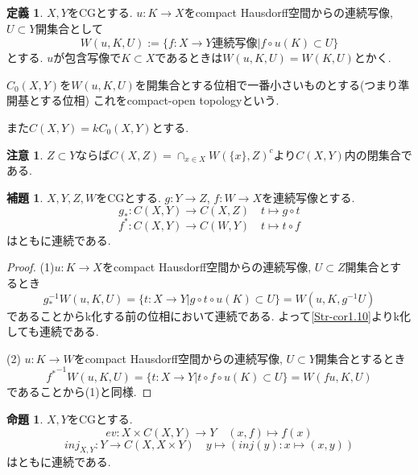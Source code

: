 \documentclass[dvipdfmx,a4paper,11pt]{article}
\theoremstyle{definition}
\newtheorem{lem}[thm]{補題}
\newtheorem{prop}[thm]{命題}
\newtheorem{dfn}[thm]{定義}
\newtheorem{rem}[thm]{注意}
\begin{document}
 \begin{tcolorbox}
 [colback = white, colframe = green!35!black, fonttitle = \bfseries,breakable = true]
\begin{dfn}\cite[Def 2.8]{Str}
$X,Y$をCGとする.
$u : K \to X$をcompact Hausdorff空間からの連続写像, $U \subset Y$開集合として
$$
W(u,K,U)
:=
\{f : X \to Y \text{連続写像}| f \circ u(K) \subset U \}
$$
とする. 
$u$が包含写像で$K \subset X$であるときは$W(u,K,U) = W(K,U)$とかく.

$C_0(X,Y)$を$W(u,K,U)$を開集合とする位相で一番小さいものとする(つまり準開基とする位相)
これをcompact-open topologyという.

また$C(X,Y) = kC_0(X,Y)$とする.
\end{dfn}
\end{tcolorbox}

\begin{rem}
$Z \subset Y$ならば$C(X,Z) =\cap_{x \in X} W(\{ x\},Z)^c$より$C(X,Y)$内の閉集合である.
\end{rem}

 \begin{tcolorbox}
 [colback = white, colframe = green!35!black, fonttitle = \bfseries,breakable = true]
\begin{lem}\cite[Lemma 2.10]{Str}
$X,Y,Z,W$をCGとする. 
$g : Y \to Z$, $f : W\to X$を連続写像とする. 
$$
g_{*} : C(X,Y) \to C(X,Z) \quad t \mapsto g \circ t
$$
$$
f^{*} : C(X,Y) \to C(W,Y) \quad t \mapsto t \circ f
$$
はともに連続である.
\end{lem}
\end{tcolorbox}

\begin{proof}
(1)$u : K \to X$をcompact Hausdorff空間からの連続写像, $U \subset Z$開集合とするとき
$$
g_{*}^{-1}W(u,K,U)
=\{ t : X \to Y | g \circ t \circ u(K) \subset U\}
=W(u,K,g^{-1}U)
$$
であることからk化する前の位相において連続である.
よって\ref{Str-cor1.10}よりk化しても連続である. 

(2) $u : K \to W$をcompact Hausdorff空間からの連続写像, $U \subset Y$開集合とするとき
$$
{f^{*}}^{-1}W(u,K,U)
=\{ t : X \to Y | t \circ f \circ u(K) \subset U\}
=W(fu,K,U)
$$
であることから(1)と同様. 
\end{proof}

 \begin{tcolorbox}
 [colback = white, colframe = green!35!black, fonttitle = \bfseries,breakable = true]
\begin{prop}\cite[Prop2.11]{Str}
\label{Str-prop2.11}
$X,Y$をCGとする. 
$$
ev: X \times  C(X,Y) \to Y \quad (x,f) \mapsto f(x)
$$
$$
inj_{X,Y}: Y \to C(X,X \times Y) \quad y \mapsto (inj(y) : x \mapsto (x,y))
$$
はともに連続である. 
\end{prop}
\end{tcolorbox}
\end{document}

